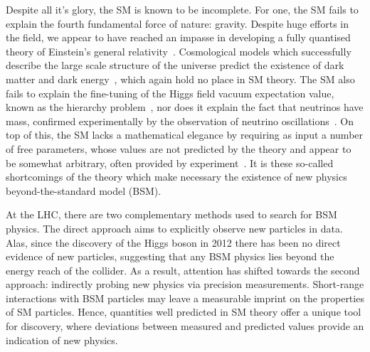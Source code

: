 Despite all it's glory, the SM is known to be incomplete. For one, the SM fails to explain the fourth fundamental force of nature: gravity. Despite huge efforts in the field, we appear to have reached an impasse in developing a fully quantised theory of Einstein's general relativity~\cite{}. Cosmological models which successfully describe the large scale structure of the universe predict the existence of dark matter and dark energy~\cite{Aghanim:2018eyx}, which again hold no place in SM theory. The SM also fails to explain the fine-tuning of the Higgs field vacuum expectation value, known as the hierarchy problem~\cite{PhysRevD.13.974,PhysRevD.20.2619}, nor does it explain the fact that neutrinos have mass, confirmed experimentally by the observation of neutrino oscillations~\cite{Fukuda:1998mi}. On top of this, the SM lacks a mathematical elegance by requiring as input a number of free parameters, whose values are not predicted by the theory and appear to be somewhat arbitrary, often provided by experiment~\cite{Zyla:2020zbs}. It is these so-called shortcomings of the theory which make necessary the existence of new physics beyond-the-standard model (BSM).

At the LHC, there are two complementary methods used to search for BSM physics. The direct approach aims to explicitly observe new particles in data. Alas, since the discovery of the Higgs boson in 2012 there has been no direct evidence of new particles, suggesting that any BSM physics lies beyond the energy reach of the collider. As a result, attention has shifted towards the second approach: indirectly probing new physics via precision measurements. Short-range interactions with BSM particles may leave a measurable imprint on the properties of SM particles. Hence, quantities well predicted in SM theory offer a unique tool for discovery, where deviations between measured and predicted values provide an indication of new physics. 

